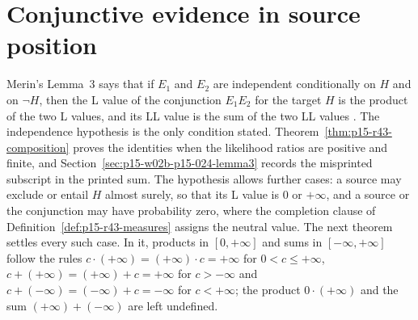 \section{Conjunctive evidence in source position}
\label{sec:p15-w02c-p15-027-conjunction}

Merin's Lemma~3 says that if \(E_1\) and \(E_2\) are independent
conditionally on \(H\) and on \(\neg H\), then the L value of the
conjunction \(E_1E_2\) for the target \(H\) is the product of the two L
values, and its LL value is the sum of the two LL values
\cite[p.~271]{Merin2021Relevance}. The independence hypothesis is the
only condition stated. Theorem~\ref{thm:p15-r43-composition} proves the
identities when the likelihood ratios are positive and finite, and
Section~\ref{sec:p15-w02b-p15-024-lemma3} records the misprinted
subscript in the printed sum. The hypothesis allows further cases: a
source may exclude or entail \(H\) almost surely, so that its L value is
\(0\) or \(+\infty\), and a source or the conjunction may have
probability zero, where the completion clause of
Definition~\ref{def:p15-r43-measures} assigns the neutral value. The
next theorem settles every such case. In it, products in \([0,+\infty]\)
and sums in \([-\infty,+\infty]\) follow the rules
\(c\cdot(+\infty)=(+\infty)\cdot c=+\infty\) for \(0<c\leq+\infty\),
\(c+(+\infty)=(+\infty)+c=+\infty\) for \(c>-\infty\) and
\(c+(-\infty)=(-\infty)+c=-\infty\) for \(c<+\infty\); the product
\(0\cdot(+\infty)\) and the sum \((+\infty)+(-\infty)\) are left
undefined.


